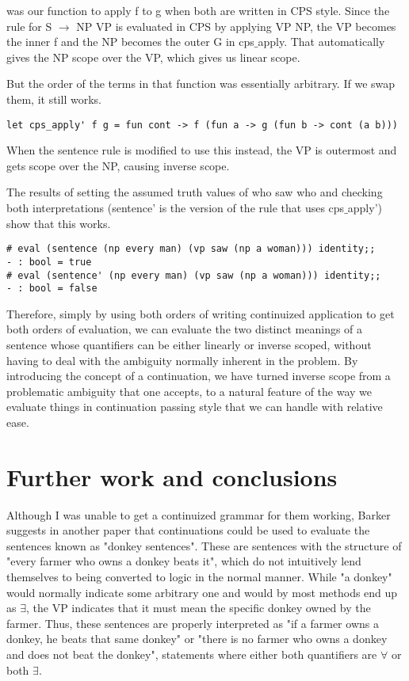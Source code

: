 \documentclass[11pt]{article} %
\begin{document}
was our function to apply f to g when both are written in CPS style. Since the rule for S $\rightarrow$ NP VP is evaluated in CPS by applying VP NP, the VP becomes the inner f and the NP becomes the outer G in cps$\_$apply. That automatically gives the NP scope over the VP, which gives us linear scope.

But the order of the terms in that function was essentially arbitrary. If we swap them, it still works.

\begin{lstlisting}
let cps_apply' f g = fun cont -> f (fun a -> g (fun b -> cont (a b)))
\end{lstlisting}

When the sentence rule is modified to use this instead, the VP is outermost and gets scope over the NP, causing inverse scope.

The results of setting the assumed truth values of who saw who and checking both interpretations (sentence' is the version of the rule that uses cps$\_$apply') show that this works.

\begin{lstlisting}
# eval (sentence (np every man) (vp saw (np a woman))) identity;;
- : bool = true
# eval (sentence' (np every man) (vp saw (np a woman))) identity;;
- : bool = false
\end{lstlisting}

Therefore, simply by using both orders of writing continuized application to get both orders of evaluation, we can evaluate the two distinct meanings of a sentence whose quantifiers can be either linearly or inverse scoped, without having to deal with the ambiguity normally inherent in the problem. By introducing the concept of a continuation, we have turned inverse scope from a problematic ambiguity that one accepts, to a natural feature of the way we evaluate things in continuation passing style that we can handle with relative ease.

\section{Further work and conclusions}

Although I was unable to get a continuized grammar for them working, Barker suggests in another paper that continuations could be used to evaluate the sentences known as "donkey sentences". These are sentences with the structure of "every farmer who owns a donkey beats it", which do not intuitively lend themselves to being converted to logic in the normal manner. While "a donkey" would normally indicate some arbitrary one and would by most methods end up as $\exists$, the VP indicates that it must mean the specific donkey owned by the farmer. Thus, these sentences are properly interpreted as "if a farmer owns a donkey, he beats that same donkey" or "there is no farmer who owns a donkey and does not beat the donkey", statements where either both quantifiers are $\forall$ or both $\exists$.
\end{document}
